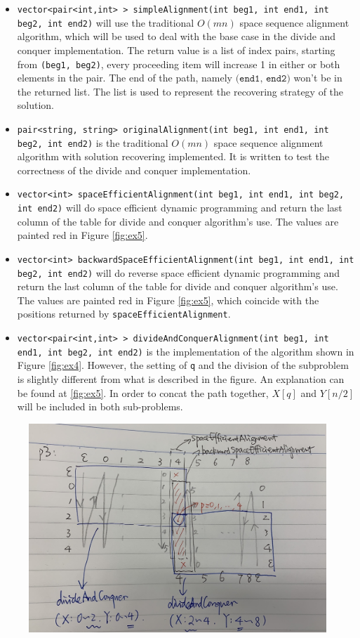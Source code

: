 \begin{exercise}
\begin{solution}
  \begin{itemize}
    \item \texttt{vector<pair<int,int> > simpleAlignment(int beg1, int end1, int beg2, int end2)} will use the traditional $O(mn)$ space sequence alignment algorithm, which will be used to deal with the base case in the divide and conquer implementation. The return value is a list of index pairs, starting from \texttt{(beg1, beg2)}, every proceeding item will increase 1 in either or both elements in the pair. The end of the path, namely $\texttt{(end1, end2)}$ won't be in the returned list. The list is used to represent the recovering strategy of the solution. 
    \item \texttt{pair<string, string> originalAlignment(int beg1, int end1, int beg2, int end2)} is the traditional $O(mn)$ space sequence alignment algorithm with solution recovering implemented. It is  written to test the correctness of the divide and conquer implementation.
    \item \texttt{vector<int> spaceEfficientAlignment(int beg1, int end1, int beg2, int end2)} will do space efficient dynamic programming and return the last column of the table for divide and conquer algorithm's use. The values are painted red in Figure \ref{fig:ex5}.
    \item \texttt{vector<int> backwardSpaceEfficientAlignment(int beg1, int end1, int beg2, int end2)} will do reverse space efficient dynamic programming and return the last column of the table for divide and conquer algorithm's use. The values are painted red in Figure \ref{fig:ex5}, which coincide with the positions returned by \texttt{spaceEfficientAlignment}.
    \item \texttt{vector<pair<int,int> > divideAndConquerAlignment(int beg1, int end1, int beg2, int end2)} is the implementation of the algorithm shown in Figure \ref{fig:ex4}. However, the setting of \texttt{q} and the division of the subproblem is slightly different from what is described in the figure. An explanation can be found at \ref{fig:ex5}. In order to concat the path together, $X[q]$ and $Y[n/2]$ will be included in both sub-problems.
  \end{itemize}
  \begin{figure}
    \centering
    \includegraphics[width=12cm]{img/ex4-2.jpeg}

\end{figure}
\end{solution}
\end{exercise}
